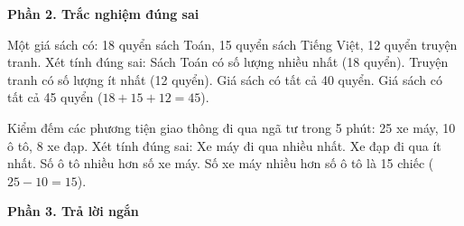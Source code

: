 \textbf{Phần 2. Trắc nghiệm đúng sai}

\begin{ex} %
Một giá sách có: 18 quyển sách Toán, 15 quyển sách Tiếng Việt, 12 quyển truyện tranh. Xét tính đúng sai:
\choiceTF
{\True Sách Toán có số lượng nhiều nhất (18 quyển).}
{\True Truyện tranh có số lượng ít nhất (12 quyển).}
{Giá sách có tất cả 40 quyển.}
{\True Giá sách có tất cả 45 quyển ($18 + 15 + 12 = 45$).}
\end{ex}

\begin{ex} %
Kiểm đếm các phương tiện giao thông đi qua ngã tư trong 5 phút: 25 xe máy, 10 ô tô, 8 xe đạp. Xét tính đúng sai:
\choiceTF
{\True Xe máy đi qua nhiều nhất.}
{\True Xe đạp đi qua ít nhất.}
{Số ô tô nhiều hơn số xe máy.}
{\True Số xe máy nhiều hơn số ô tô là 15 chiếc ($25 - 10 = 15$).}
\end{ex}

\textbf{Phần 3. Trả lời ngắn}

